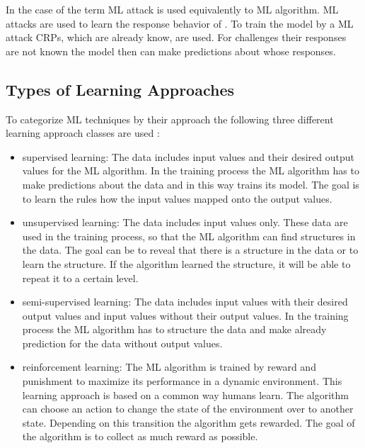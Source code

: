 In the case of \pufs the term \ac{ML} attack is used equivalently to \ac{ML} algorithm.
\ac{ML} attacks are used to learn the response behavior of \pufs. %
To train the model by a \ac{ML} attack \acp{CRP}, which are already know, are used.
For challenges their responses are not known the model then can make predictions about whose responses.


\subsection{Types of Learning Approaches}

To categorize \ac{ML} techniques by their approach the following three different learning approach classes are used \cite{Russell1995Modernapproach}:

\begin{itemize}
\item supervised learning: The data includes input values and their desired output values for the \ac{ML} algorithm. 
In the training process the \ac{ML} algorithm has to make predictions about the data and in this way trains its model. %
The goal is to learn the rules how the input values mapped onto the output values.
\item unsupervised learning: The data includes input values only.
These data are used in the training process, so that the \ac{ML} algorithm can find structures in the data. %
The goal can be to reveal that there is a structure in the data or to learn the structure.
If the algorithm learned the structure, it will be able to repeat it to a certain level.
\item semi-supervised learning: The data includes input values with their desired output values and input values without their output values. %
In the training process the \ac{ML} algorithm has to structure the data and make already prediction for the data without output values.
\item reinforcement learning: The \ac{ML} algorithm is trained by reward and punishment to maximize its performance in a dynamic environment.
This learning approach is based on a common way humans learn. %
The algorithm can choose an action to change the state of the environment over to another state.
Depending on this transition the algorithm gets rewarded.
The goal of the algorithm is to collect as much reward as possible.
\end{itemize}

